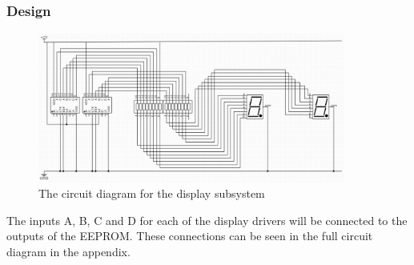 \subsubsection{Design}
\begin{figure}[H]
    \centering
    \includegraphics[width=0.9\textwidth]{images/displayCircuitDiagram.jpg}
    \caption{The circuit diagram for the display subsystem}
    \label{fig:displayCircuitDiagram}
\end{figure}
The inputs A, B, C and D for each of the display drivers will be connected to the outputs of the EEPROM. These connections can be seen in the full circuit diagram in the appendix.

